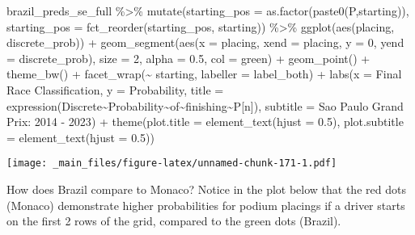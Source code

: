 \documentclass[
]{book}
\newenvironment{Shaded}{\begin{snugshade}}{\end{snugshade}}
\newcommand{\AttributeTok}[1]{\textcolor[rgb]{0.77,0.63,0.00}{#1}}
\newcommand{\DecValTok}[1]{\textcolor[rgb]{0.00,0.00,0.81}{#1}}
\newcommand{\FloatTok}[1]{\textcolor[rgb]{0.00,0.00,0.81}{#1}}
\newcommand{\FunctionTok}[1]{\textcolor[rgb]{0.00,0.00,0.00}{#1}}
\newcommand{\NormalTok}[1]{#1}
\newcommand{\SpecialCharTok}[1]{\textcolor[rgb]{0.00,0.00,0.00}{#1}}
\newcommand{\StringTok}[1]{\textcolor[rgb]{0.31,0.60,0.02}{#1}}
\begin{document}
\begin{Shaded}
\begin{Highlighting}[]
\NormalTok{brazil\_preds\_se\_full }\SpecialCharTok{\%\textgreater{}\%}
  \FunctionTok{mutate}\NormalTok{(}\AttributeTok{starting\_pos =} \FunctionTok{as.factor}\NormalTok{(}\FunctionTok{paste0}\NormalTok{(}\StringTok{\textquotesingle{}P\textquotesingle{}}\NormalTok{,starting)),}
         \AttributeTok{starting\_pos =} \FunctionTok{fct\_reorder}\NormalTok{(starting\_pos, starting)) }\SpecialCharTok{\%\textgreater{}\%}
  \FunctionTok{ggplot}\NormalTok{(}\FunctionTok{aes}\NormalTok{(placing, discrete\_prob)) }\SpecialCharTok{+}
  \FunctionTok{geom\_segment}\NormalTok{(}\FunctionTok{aes}\NormalTok{(}\AttributeTok{x =}\NormalTok{ placing, }\AttributeTok{xend =}\NormalTok{ placing, }\AttributeTok{y =} \DecValTok{0}\NormalTok{, }\AttributeTok{yend =}\NormalTok{ discrete\_prob),}
               \AttributeTok{size =} \DecValTok{2}\NormalTok{, }\AttributeTok{alpha =} \FloatTok{0.5}\NormalTok{, }\AttributeTok{col =} \StringTok{\textquotesingle{}green\textquotesingle{}}\NormalTok{) }\SpecialCharTok{+}
  \FunctionTok{geom\_point}\NormalTok{() }\SpecialCharTok{+}
  \FunctionTok{theme\_bw}\NormalTok{() }\SpecialCharTok{+}
  \FunctionTok{facet\_wrap}\NormalTok{(}\SpecialCharTok{\textasciitilde{}}\NormalTok{ starting, }\AttributeTok{labeller =}\NormalTok{ label\_both) }\SpecialCharTok{+}
  \FunctionTok{labs}\NormalTok{(}\AttributeTok{x =} \StringTok{\textquotesingle{}Final Race Classification\textquotesingle{}}\NormalTok{,}
       \AttributeTok{y =} \StringTok{\textquotesingle{}Probability\textquotesingle{}}\NormalTok{,}
       \AttributeTok{title =} \FunctionTok{expression}\NormalTok{(Discrete}\SpecialCharTok{\textasciitilde{}}\NormalTok{Probability}\SpecialCharTok{\textasciitilde{}}\NormalTok{of}\SpecialCharTok{\textasciitilde{}}\NormalTok{finishing}\SpecialCharTok{\textasciitilde{}}\NormalTok{P[n]),}
       \AttributeTok{subtitle =} \StringTok{\textquotesingle{}Sao Paulo Grand Prix: 2014 {-} 2023\textquotesingle{}}\NormalTok{) }\SpecialCharTok{+}
  \FunctionTok{theme}\NormalTok{(}\AttributeTok{plot.title =} \FunctionTok{element\_text}\NormalTok{(}\AttributeTok{hjust =} \FloatTok{0.5}\NormalTok{),}
        \AttributeTok{plot.subtitle =} \FunctionTok{element\_text}\NormalTok{(}\AttributeTok{hjust =} \FloatTok{0.5}\NormalTok{)) }
\end{Highlighting}
\end{Shaded}

\texttt{[image: \_main\_files/figure-latex/unnamed-chunk-171-1.pdf]}

How does Brazil compare to Monaco? Notice in the plot below that the red dots (Monaco) demonstrate higher probabilities for podium placings if a driver starts on the first 2 rows of the grid, compared to the green dots (Brazil).
\end{document}
